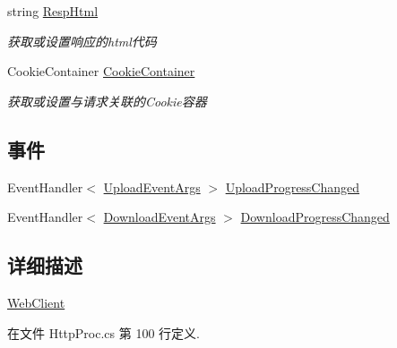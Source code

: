 \begin{DoxyCompactItemize}
string \hyperlink{class_x_c_l_net_tools_1_1_file_handler_1_1_web_client_a67e90e96bd067171c16cb84d75f66c3a}{Resp\-Html}
\begin{DoxyCompactList}\small\item\em 获取或设置响应的html代码 \end{DoxyCompactList}\item 
Cookie\-Container \hyperlink{class_x_c_l_net_tools_1_1_file_handler_1_1_web_client_adeaa1201074e43df3743d76ea77cf06e}{Cookie\-Container}
\begin{DoxyCompactList}\small\item\em 获取或设置与请求关联的\-Cookie容器 \end{DoxyCompactList}\end{DoxyCompactItemize}
\subsection*{事件}
\begin{DoxyCompactItemize}
\item 
Event\-Handler$<$ \hyperlink{class_x_c_l_net_tools_1_1_file_handler_1_1_upload_event_args}{Upload\-Event\-Args} $>$ \hyperlink{class_x_c_l_net_tools_1_1_file_handler_1_1_web_client_abe950fa329508b4c52e3181aeb97585f}{Upload\-Progress\-Changed}
\item 
Event\-Handler$<$ \hyperlink{class_x_c_l_net_tools_1_1_file_handler_1_1_download_event_args}{Download\-Event\-Args} $>$ \hyperlink{class_x_c_l_net_tools_1_1_file_handler_1_1_web_client_aa1e50d608381b728356547eff9f80213}{Download\-Progress\-Changed}
\end{DoxyCompactItemize}


\subsection{详细描述}
\hyperlink{class_x_c_l_net_tools_1_1_file_handler_1_1_web_client}{Web\-Client} 



在文件 Http\-Proc.\-cs 第 100 行定义.



